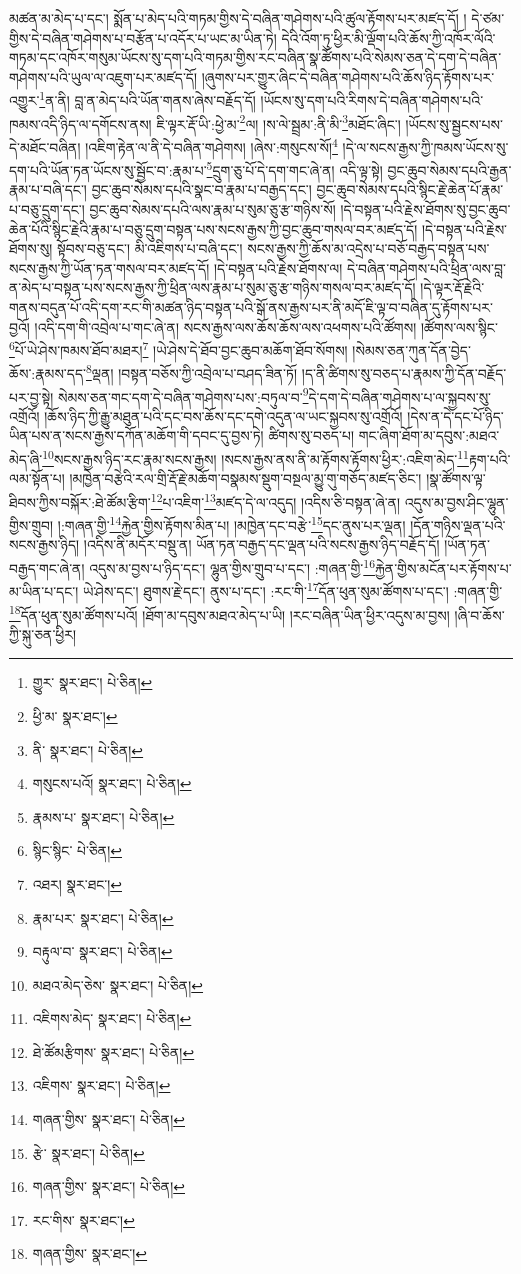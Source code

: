 མཚན་མ་མེད་པ་དང་། སྨོན་པ་མེད་པའི་གཏམ་གྱིས་དེ་བཞིན་གཤེགས་པའི་ཚུལ་རྟོགས་པར་མཛད་དོ། །
དེ་ཙམ་གྱིས་དེ་བཞིན་གཤེགས་པ་བརྩོན་པ་འདོར་པ་ཡང་མ་ཡིན་ཏེ། དེའི་འོག་ཏུ་ཕྱིར་མི་ལྡོག་པའི་ཆོས་ཀྱི་འཁོར་ལོའི་གཏམ་དང་འཁོར་གསུམ་ཡོངས་སུ་དག་པའི་གཏམ་གྱིས་རང་བཞིན་སྣ་ཚོགས་པའི་སེམས་ཅན་དེ་དག་དེ་བཞིན་གཤེགས་པའི་ཡུལ་ལ་འཇུག་པར་མཛད་དོ། །ཞུགས་པར་གྱུར་ཞིང་དེ་བཞིན་གཤེགས་པའི་ཆོས་ཉིད་རྟོགས་པར་འགྱུར་\footnote{གྱུར་  སྣར་ཐང་།  པེ་ཅིན། }ན་ནི། བླ་ན་མེད་པའི་ཡོན་གནས་ཞེས་བརྗོད་དོ། །ཡོངས་སུ་དག་པའི་རིགས་དེ་བཞིན་གཤེགས་པའི་ཁམས་འདི་ཉིད་ལ་དགོངས་ནས། ཇི་ལྟར་རྡོ་ཡི་:ཕྱེ་མ་\footnote{ཕྱི་མ་  སྣར་ཐང་། }ལ། །ས་ལེ་སྦྲམ་:ནི་མི་\footnote{ནི་  སྣར་ཐང་།  པེ་ཅིན། }མཐོང་ཞིང་། །ཡོངས་སུ་སྦྱངས་པས་དེ་མཐོང་བཞིན། །འཇིག་རྟེན་ལ་ནི་དེ་བཞིན་གཤེགས། །ཞེས་:གསུངས་སོ།\footnote{གསུངས་པའོ།  སྣར་ཐང་།  པེ་ཅིན། } །དེ་ལ་སངས་རྒྱས་ཀྱི་ཁམས་ཡོངས་སུ་དག་པའི་ཡོན་ཏན་ཡོངས་སུ་སྦྱོང་བ་:རྣམ་པ་\footnote{རྣམས་པ་  སྣར་ཐང་།  པེ་ཅིན། }དྲུག་ཅུ་པོ་དེ་དག་གང་ཞེ་ན། འདི་ལྟ་སྟེ། བྱང་ཆུབ་སེམས་དཔའི་རྒྱན་རྣམ་པ་བཞི་དང་། བྱང་ཆུབ་སེམས་དཔའི་སྣང་བ་རྣམ་པ་བརྒྱད་དང་། བྱང་ཆུབ་སེམས་དཔའི་སྙིང་རྗེ་ཆེན་པོ་རྣམ་པ་བཅུ་དྲུག་དང་། བྱང་ཆུབ་སེམས་དཔའི་ལས་རྣམ་པ་སུམ་ཅུ་རྩ་གཉིས་སོ། །དེ་བསྟན་པའི་རྗེས་ཐོགས་སུ་བྱང་ཆུབ་ཆེན་པོའི་སྙིང་རྗེའི་རྣམ་པ་བཅུ་དྲུག་བསྟན་པས་སངས་རྒྱས་ཀྱི་བྱང་ཆུབ་གསལ་བར་མཛད་དོ། །དེ་བསྟན་པའི་རྗེས་ཐོགས་སུ། སྟོབས་བཅུ་དང་། མི་འཇིགས་པ་བཞི་དང་། སངས་རྒྱས་ཀྱི་ཆོས་མ་འདྲེས་པ་བཅོ་བརྒྱད་བསྟན་པས་སངས་རྒྱས་ཀྱི་ཡོན་ཏན་གསལ་བར་མཛད་དོ། །དེ་བསྟན་པའི་རྗེས་ཐོགས་ལ། དེ་བཞིན་གཤེགས་པའི་ཕྲིན་ལས་བླ་ན་མེད་པ་བསྟན་པས་སངས་རྒྱས་ཀྱི་ཕྲིན་ལས་རྣམ་པ་སུམ་ཅུ་རྩ་གཉིས་གསལ་བར་མཛད་དོ། །དེ་ལྟར་རྡོ་རྗེའི་གནས་བདུན་པོ་འདི་དག་རང་གི་མཚན་ཉིད་བསྟན་པའི་སྒོ་ནས་རྒྱས་པར་ནི་མདོ་ཇི་ལྟ་བ་བཞིན་དུ་རྟོགས་པར་བྱའོ། །འདི་དག་གི་འབྲེལ་པ་གང་ཞེ་ན། སངས་རྒྱས་ལས་ཆོས་ཆོས་ལས་འཕགས་པའི་ཚོགས། །ཚོགས་ལས་སྙིང་\footnote{སྙིང་སྙིང་  པེ་ཅིན། }པོ་ཡེ་ཤེས་ཁམས་ཐོབ་མཐར།\footnote{འཐར།  སྣར་ཐང་། } །ཡེ་ཤེས་དེ་ཐོབ་བྱང་ཆུབ་མཆོག་ཐོབ་སོགས། །སེམས་ཅན་ཀུན་དོན་བྱེད་ཆོས་:རྣམས་དད་\footnote{རྣམ་པར་  སྣར་ཐང་།  པེ་ཅིན། }ལྡན། །བསྟན་བཅོས་ཀྱི་འབྲེལ་པ་བཤད་ཟིན་ཏོ། །ད་ནི་ཚིགས་སུ་བཅད་པ་རྣམས་ཀྱི་དོན་བརྗོད་པར་བྱ་སྟེ། སེམས་ཅན་གང་དག་དེ་བཞིན་གཤེགས་པས་:བཏུལ་བ་\footnote{བརྟུལ་བ་  སྣར་ཐང་།  པེ་ཅིན། }དེ་དག་དེ་བཞིན་གཤེགས་པ་ལ་སྐྱབས་སུ་འགྲོའོ། །ཆོས་ཉིད་ཀྱི་རྒྱུ་མཐུན་པའི་དང་བས་ཆོས་དང་དགེ་འདུན་ལ་ཡང་སྐྱབས་སུ་འགྲོའོ། །དེས་ན་དེ་དང་པོ་ཉིད་ཡིན་པས་ན་སངས་རྒྱས་དཀོན་མཆོག་གི་དབང་དུ་བྱས་ཏེ། ཚིགས་སུ་བཅད་པ། གང་ཞིག་ཐོག་མ་དབུས་:མཐའ་མེད་ཞི་\footnote{མཐའ་མེད་ཅེས་  སྣར་ཐང་།  པེ་ཅིན། }སངས་རྒྱས་ཉིད་རང་རྣམ་སངས་རྒྱས། །སངས་རྒྱས་ནས་ནི་མ་རྟོགས་རྟོགས་ཕྱིར་:འཇིག་མེད་\footnote{འཇིགས་མེད་  སྣར་ཐང་།  པེ་ཅིན། }རྟག་པའི་ལམ་སྟོན་པ། །མཁྱེན་བརྩེའི་རལ་གྲི་རྡོ་རྗེ་མཆོག་བསྣམས་སྡུག་བསྔལ་མྱུ་གུ་གཅོད་མཛད་ཅིང་། །སྣ་ཚོགས་ལྟ་ཐིབས་ཀྱིས་བསྐོར་:ཐེ་ཚོམ་རྩིག་\footnote{ཐེ་ཚོམརྩིགས་  སྣར་ཐང་།  པེ་ཅིན། }པ་འཇིག་\footnote{འཇིགས་  སྣར་ཐང་།  པེ་ཅིན། }མཛད་དེ་ལ་འདུད། །འདིས་ཅི་བསྟན་ཞེ་ན། འདུས་མ་བྱས་ཤིང་ལྷུན་གྱིས་གྲུབ། །:གཞན་གྱི་\footnote{གཞན་གྱིས་  སྣར་ཐང་།  པེ་ཅིན། }རྐྱེན་གྱིས་རྟོགས་མིན་པ། །མཁྱེན་དང་བརྩེ་\footnote{རྩེ་  སྣར་ཐང་།  པེ་ཅིན། }དང་ནུས་པར་ལྡན། །དོན་གཉིས་ལྡན་པའི་སངས་རྒྱས་ཉིད། །འདིས་ནི་མདོར་བསྡུ་ན། ཡོན་ཏན་བརྒྱད་དང་ལྡན་པའི་སངས་རྒྱས་ཉིད་བརྗོད་དོ། །ཡོན་ཏན་བརྒྱད་གང་ཞེ་ན། འདུས་མ་བྱས་པ་ཉིད་དང་། ལྷུན་གྱིས་གྲུབ་པ་དང་། :གཞན་གྱི་\footnote{གཞན་གྱིས་  སྣར་ཐང་།  པེ་ཅིན། }རྐྱེན་གྱིས་མངོན་པར་རྟོགས་པ་མ་ཡིན་པ་དང་། ཡེ་ཤེས་དང་། ཐུགས་རྗེ་དང་། ནུས་པ་དང་། :རང་གི་\footnote{རང་གིས་  སྣར་ཐང་། }དོན་ཕུན་སུམ་ཚོགས་པ་དང་། :གཞན་གྱི་\footnote{གཞན་གྱིས་  སྣར་ཐང་། }དོན་ཕུན་སུམ་ཚོགས་པའོ། །ཐོག་མ་དབུས་མཐའ་མེད་པ་ཡི། །རང་བཞིན་ཡིན་ཕྱིར་འདུས་མ་བྱས། །ཞི་བ་ཆོས་ཀྱི་སྐུ་ཅན་ཕྱིར། 